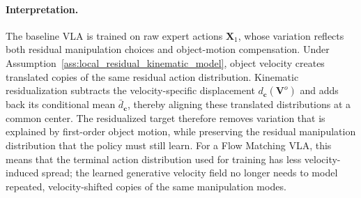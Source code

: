 \documentclass[10pt,twocolumn,letterpaper]{article}
\begin{document}
\paragraph{Interpretation.}
The baseline VLA is trained on raw expert actions $\mathbf X_1$, whose
variation reflects both residual manipulation choices and object-motion
compensation. Under Assumption~\ref{ass:local_residual_kinematic_model}, object
velocity creates translated copies of the same residual action distribution.
Kinematic residualization subtracts the velocity-specific displacement
$d_{\mathbf c}(\mathbf V^{o})$ and adds back its conditional mean
$\bar d_{\mathbf c}$, thereby aligning these translated distributions at a
common center. The residualized target therefore removes variation that is
explained by first-order object motion, while preserving the residual
manipulation distribution that the policy must still learn. For a Flow Matching
VLA, this means that the terminal action distribution used for training has less
velocity-induced spread; the learned generative velocity field no longer needs
to model repeated, velocity-shifted copies of the same manipulation modes.
\end{document}
